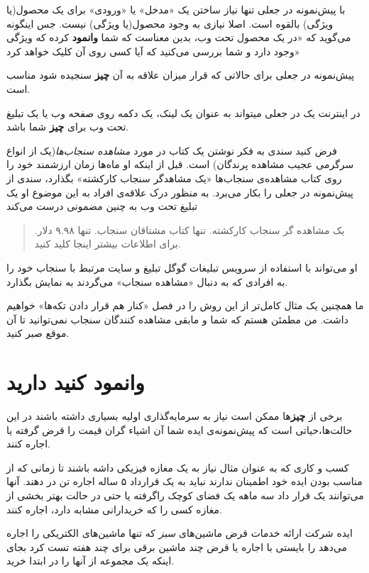 با پیش‌نمونه در جعلی تنها نیاز ساختن یک «مدخل» یا «ورودی» برای یک
محصول(یا ویژگی) بالقوه است. اصلا نیازی به وجود محصول(یا ویژگی) نیست. جس
اینگونه می‌گوید که «در یک محصول تحت وب، بدین معناست که شما
\textbf{وانمود} کرده که ویژگی وجود دارد و شما بررسی می‌کنید که آیا کسی
روی آن کلیک خواهد کرد»

پیش‌نمونه در جعلی برای حالاتی که قرار میزان علاقه به آن \textbf{چیز}
سنجیده شود مناسب است.

در اینترنت یک در جعلی میتواند به عنوان یک لینک، یک دکمه روی صفحه وب یا
یک تبلیغ تحت وب برای \textbf{چیز} شما باشد.

فرض کنید سندی به فکر نوشتن یک کتاب در مورد \emph{مشاهده سنجاب‌ها}(یک از
انواع سرگرمی عجیب مشاهده پرندگان) است. قبل از اینکه او ماه‌ها زمان
ارزشمند خود را روی کتاب مشاهده‌ی سنجاب‌ها «یک مشاهدگر سنجاب کارکشته»
بگذارد، سندی از پیش‌نمونه در جعلی را بکار می‌برد. به منظور درک علاقه‌ی
افراد به این موضوع او یک تبلیغ تحت وب به چنین مضمونی درست می‌کند

\begin{quote}
یک مشاهده گر سنجاب کارکشته. تنها کتاب مشتاقان سنجاب. تنها ۹.۹۸ دلار.
برای اطلاعات بیشتر اینجا کلید کنید.
\end{quote}

او می‌تواند با استفاده از سرویس تبلیغات گوگل تبلیغ و سایت مرتبط با سنجاب
خود را به افرادی که به دنبال «مشاهده سنجاب» می‌گردند به نمایش بگذارد.

ما همچنین یک مثال کامل‌تر از این روش را در فصل «کنار هم قرار دادن
تکه‌ها» خواهیم داشت. من مطمئن هستم که شما و مابقی مشاهده کنندگان سنجاب
نمی‌توانید تا آن موقع صبر کنید.

\section{وانمود کنید
دارید}\label{ux648ux627ux646ux645ux648ux62f-ux6a9ux646ux6ccux62f-ux62fux627ux631ux6ccux62f}

برخی از \textbf{چیز}ها ممکن است نیاز به سرمایه‌گذاری اولیه بسیاری داشته
باشند در این حالت‌ها،حیاتی است که پیش‌نمونه‌ی ایده شما آن اشیاء گران
قیمت را قرض گرفته یا اجاره کنند.

کسب و کاری که به عنوان مثال نیاز به یک مغازه فیزیکی داشه باشند تا زمانی
که از مناسب بودن ایده خود اطمینان ندارند نباید به یک قرارداد ۵ ساله
اجاره تن در دهند. آنها می‌توانند یک قرار داد سه ماهه یک فضای کوچک
راگرفته یا حتی در حالت بهتر بخشی از مغازه کسی را که خریدارانی مشابه
دارد، اجاره کنند.

ایده شرکت ارائه خدمات قرض ماشین‌های \emph{سبز} که تنها ماشین‌های
الکتریکی را اجاره می‌دهد را بایستی با اجاره یا قرض چند ماشین برقی برای
چند هفته تست کرد بجای اینکه یک مجموعه از آنها را در ابتدا خرید.

